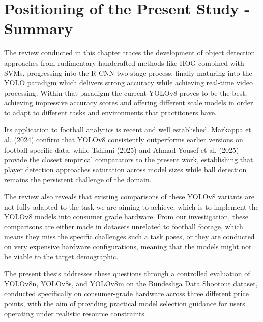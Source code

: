 \section{Positioning of the Present Study - Summary}

The review conducted in this chapter traces the development of object detection approaches from rudimentary handcrafted methods like HOG combined with SVMs, progressing into the R-CNN two-stage process, finally maturing into the YOLO paradigm which delivers strong accuracy while achieving real-time video processing. Within that paradigm the current YOLOv8 proves to be the best, achieving impressive accuracy scores and offering different scale models in order to adapt to different tasks and environments that practitoners have.

Its application to football analytics is recent and well established. Markappa et al. (2024)\cite{RN14} confirm that YOLOv8 consistently outperforms earlier versions on football-specific data, while Tshiani (2025)\cite{RN15}  and Ahmad Yousef et al. (2025)\cite{RN13} provide the closest empirical comparators to the present work, establishing that player detection approaches saturation across model sizes while ball detection remains the persistent challenge of the domain.

The review also reveals that existing comparisons of these YOLOv8 variants are not fully adapted to the task we are aiming to achieve, which is to implement the YOLOv8 models into consumer grade hardware. From our investigation, these comparisons are either made in datasets unrelated to football footage, which means they miss the specific challenges such a task poses, or they are conducted on very expensive hardware configurations, meaning that the models might not be viable to the target demographic. 

The present thesis addresses these questions through a controlled evaluation of YOLOv8n, YOLOv8s, and YOLOv8m on the Bundesliga Data Shootout dataset, conducted specifically on consumer-grade hardware across three different price points, with the aim of providing practical model selection guidance for users operating under realistic resource constraints
